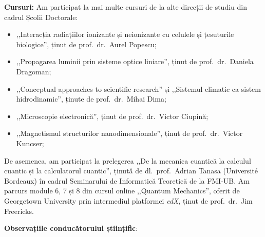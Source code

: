 \vspace{0.5em}

\textbf{Cursuri:}
Am participat la mai multe cursuri de la alte direcții de studiu din cadrul Școlii Doctorale:
\begin{itemize}
    \item ,,Interacția radiațiilor ionizante și neionizante cu celulele și țesuturile biologice'', ținut de prof.~dr.~Aurel Popescu;
    \item ,,Propagarea luminii prin sisteme optice liniare'', ținut de prof.~dr.~Daniela Dragoman;
    \item ,,Conceptual approaches to scientific research'' și ,,Sistemul climatic ca sistem hidrodinamic'', ținute de prof.~dr.~Mihai Dima;
    \item ,,Microscopie electronică'', ținut de prof.~dr.~Victor Ciupină;
    \item ,,Magnetismul structurilor nanodimensionale'', ținut de prof.~dr.~Victor Kuncser;
\end{itemize}
De asemenea, am participat la prelegerea ,,De la mecanica cuantică la calculul cuantic și la calculatorul cuantic'', ținută de dl.~prof.~Adrian Tanasa (Université Bordeaux) în cadrul Seminarului de Informatică Teoretică de la FMI-UB. Am parcurs module 6, 7 și 8 din cursul online ,,Quantum Mechanics'', oferit de Georgetown University prin intermediul platformei \textit{edX}, ținut de prof.~dr.~Jim Freericks.

\vspace{0.5em}

\textbf{Observațiile conducătorului științific}:

\vspace{2em}

